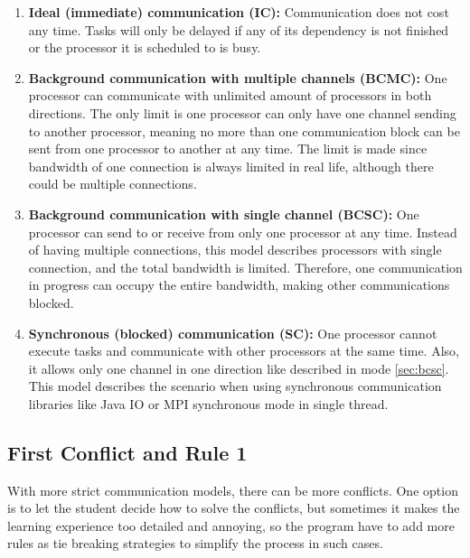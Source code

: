 \documentclass[msc,deptreport, cs]{infthesis}
\begin{document}
\begin{enumerate}
  \item \textbf{Ideal (immediate) communication (IC):} Communication does not cost any time. Tasks will only be delayed if any of its dependency is not finished or the processor it is scheduled to is busy.
  \item \textbf{Background communication with multiple channels (BCMC):} One processor can communicate with unlimited amount of processors in both directions. The only limit is one processor can only have one channel sending to another processor, meaning no more than one communication block can be sent from one processor to another at any time. The limit is made since bandwidth of one connection is always limited in real life, although there could be multiple connections.
  \item \label{sec:bcsc} \textbf{Background communication with single channel (BCSC):} One processor can send to or receive from only one processor at any time. Instead of having multiple connections, this model describes processors with single connection, and the total bandwidth is limited. Therefore, one communication in progress can occupy the entire bandwidth, making other communications blocked.
  \item \textbf{Synchronous (blocked) communication (SC):} One processor cannot execute tasks and communicate with other processors at the same time. Also, it allows only one channel in one direction like described in mode \ref{sec:bcsc}. This model describes the scenario when using synchronous communication libraries like Java IO or MPI synchronous mode in single thread.
\end{enumerate}

\subsection{First Conflict and Rule 1}

With more strict communication models, there can be more conflicts. One option is to let the student decide how to solve the conflicts, but sometimes it makes the learning experience too detailed and annoying, so the program have to add more rules as tie breaking strategies to simplify the process in such cases.
\end{document}

